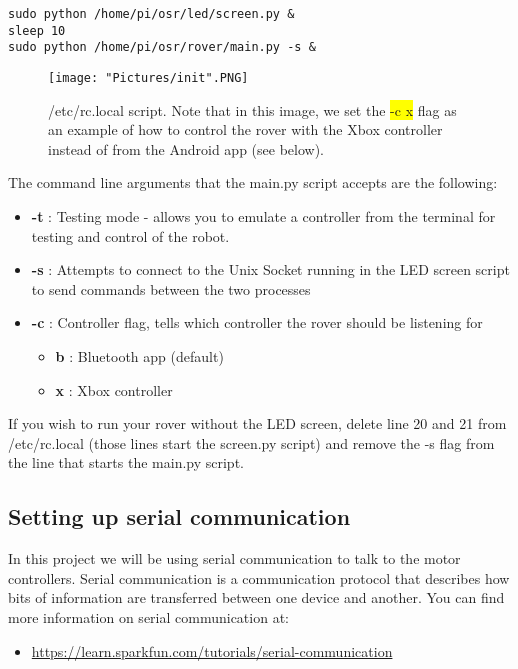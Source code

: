 \documentclass[12pt]{article}
\begin{document}
\begin{verbatim}
sudo python /home/pi/osr/led/screen.py &
sleep 10
sudo python /home/pi/osr/rover/main.py -s &
\end{verbatim}

\begin{figure}[H]
 	\centering
	\texttt{[image: "Pictures/init".PNG]}
 	\caption{/etc/rc.local script.  Note that in this image, we set the \colorbox{yellow}{-c x} flag as an example of how to control the rover with the Xbox controller instead of from the Android app (see below).}
	\label{init}
\end{figure}

The command line arguments that the main.py script accepts are the following:

\begin{itemize}
	\item[] \textbf{-t} : Testing mode - allows you to emulate a controller from the terminal for testing and control of the robot. 
	\item[] \textbf{-s} : Attempts to connect to the Unix Socket running in the LED screen script to send commands between the two processes
	\item[] \textbf{-c} : Controller flag, tells which controller the rover should be listening for
	\begin{itemize}
		\item [] \textbf{b} : Bluetooth app (default)
		\item [] \textbf{x} : Xbox controller
	\end{itemize} 	

\end{itemize}

If you wish to run your rover without the LED screen, delete line 20 and 21 from /etc/rc.local (those lines start the screen.py script) and remove the -s flag from the line that starts the main.py script.

\subsection{Setting up serial communication}	

In this project we will be using serial communication to talk to the motor controllers. Serial communication is a communication protocol that describes how bits of information are transferred between one device and another. You can find more information on serial communication at:
\begin{itemize}
	\item \href{https://learn.sparkfun.com/tutorials/serial-communication}{https://learn.sparkfun.com/tutorials/serial-communication}
\end{itemize}
\end{document}

